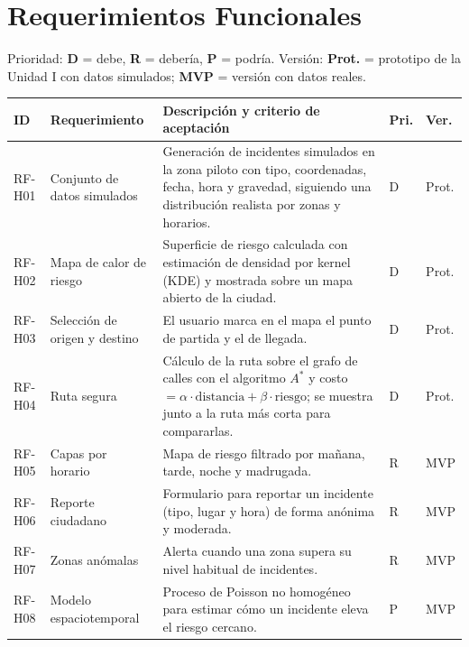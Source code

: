 \documentclass[11pt,a4paper]{article}
\begin{document}
\section{Requerimientos Funcionales}
Prioridad: \textbf{D} = debe, \textbf{R} = debería, \textbf{P} = podría. Versión: \textbf{Prot.} = prototipo de la Unidad I con datos simulados; \textbf{MVP} = versión con datos reales.

\vspace{0.1cm}
{\small
\setlength{\tabcolsep}{4pt}
\noindent\begin{tabularx}{\textwidth}{@{}P{1.55cm} P{3.2cm} L C{0.6cm} C{0.9cm}@{}}
\toprule
{}
\textbf{ID} & \textbf{Requerimiento} & \textbf{Descripción y criterio de aceptación} & \textbf{Pri.} & \textbf{Ver.} \\
\midrule
RF-H01 & Conjunto de datos simulados & Generación de incidentes simulados en la zona piloto con tipo, coordenadas, fecha, hora y gravedad, siguiendo una distribución realista por zonas y horarios. & D & Prot. \\
RF-H02 & Mapa de calor de riesgo & Superficie de riesgo calculada con estimación de densidad por kernel (KDE) y mostrada sobre un mapa abierto de la ciudad. & D & Prot. \\
RF-H03 & Selección de origen y destino & El usuario marca en el mapa el punto de partida y el de llegada. & D & Prot. \\
RF-H04 & Ruta segura & Cálculo de la ruta sobre el grafo de calles con el algoritmo $A^*$ y costo $= \alpha \cdot \text{distancia} + \beta \cdot \text{riesgo}$; se muestra junto a la ruta más corta para compararlas. & D & Prot. \\
RF-H05 & Capas por horario & Mapa de riesgo filtrado por mañana, tarde, noche y madrugada. & R & MVP \\
RF-H06 & Reporte ciudadano & Formulario para reportar un incidente (tipo, lugar y hora) de forma anónima y moderada. & R & MVP \\
RF-H07 & Zonas anómalas & Alerta cuando una zona supera su nivel habitual de incidentes. & R & MVP \\
RF-H08 & Modelo espaciotemporal & Proceso de Poisson no homogéneo para estimar cómo un incidente eleva el riesgo cercano. & P & MVP \\
\bottomrule
\end{tabularx}
}
\end{document}
